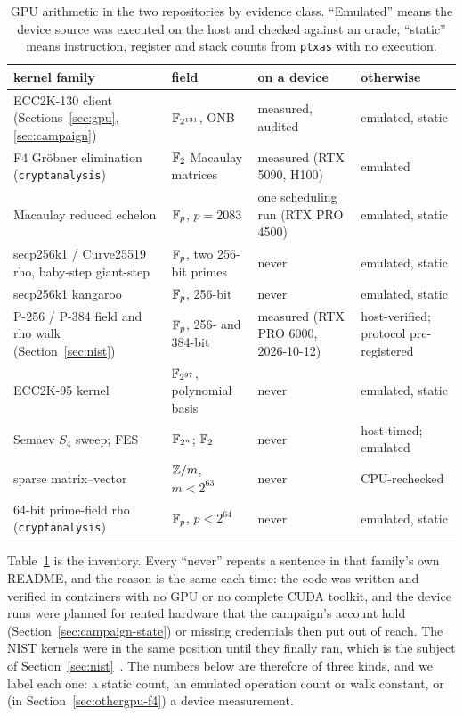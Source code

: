 \begin{table}[t]
\centering
\small
\caption{GPU arithmetic in the two repositories by evidence class.
  ``Emulated'' means the device source was executed on the host and
  checked against an oracle; ``static'' means instruction, register
  and stack counts from \texttt{ptxas} with no execution.}
\label{tab:gpu-status}
\begin{tabular}{@{}p{}p{}p{}p{}@{}}
\toprule
kernel family & field & on a device & otherwise \\
\midrule
ECC2K-130 client (Sections~\ref{sec:gpu}, \ref{sec:campaign}) & $\mathbb{F}_{2^{131}}$, ONB & measured, audited & emulated, static \\
F4 Gröbner elimination (\texttt{cryptanalysis}) & $\mathbb{F}_2$ Macaulay matrices & measured (RTX 5090, H100) & emulated \\
Macaulay reduced echelon & $\mathbb{F}_p$, $p=2083$ & one scheduling run (RTX PRO 4500) & emulated, static \\
secp256k1 / Curve25519 rho, baby-step giant-step & $\mathbb{F}_p$, two 256-bit primes & never & emulated, static \\
secp256k1 kangaroo & $\mathbb{F}_p$, 256-bit & never & emulated, static \\
P-256 / P-384 field and rho walk (Section~\ref{sec:nist}) & $\mathbb{F}_p$, 256- and 384-bit & measured (RTX PRO 6000, 2026-10-12) & host-verified; protocol pre-registered \\
ECC2K-95 kernel & $\mathbb{F}_{2^{97}}$, polynomial basis & never & emulated, static \\
Semaev $S_4$ sweep; FES & $\mathbb{F}_{2^n}$; $\mathbb{F}_2$ & never & host-timed; emulated \\
sparse matrix--vector & $\mathbb{Z}/m$, $m<2^{63}$ & never & CPU-rechecked \\
64-bit prime-field rho (\texttt{cryptanalysis}) & $\mathbb{F}_p$, $p<2^{64}$ & never & emulated, static \\
\bottomrule
\end{tabular}
\end{table}

Table~\ref{tab:gpu-status} is the inventory. Every ``never'' repeats a
sentence in that family's own README, and the reason is the same each
time: the code was written and verified in containers with no GPU or
no complete CUDA toolkit, and the device runs were planned for rented
hardware that the campaign's account hold
(Section~\ref{sec:campaign-state}) or missing credentials then put out
of reach. The NIST kernels were in the same position until they
finally ran, which is the subject of Section~\ref{sec:nist}~.
The numbers below are therefore of three kinds, and we label each
one: a static count, an emulated operation count or walk constant, or
(in Section~\ref{sec:othergpu-f4}) a device measurement.

